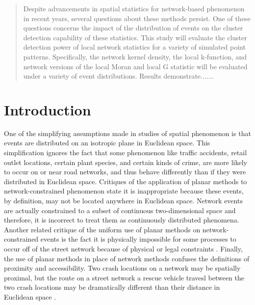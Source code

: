 \documentclass[12pt, letterpaper]{article}
\begin{document}
\maketitle{}
\newpage

\begin{abstract}

Despite advancements in spatial statistics for network-based phenomenon in recent years, several questions about these methods persist. One of these questions concerns the impact of the distribution of events on the cluster detection capability of these statistics. This study will evaluate the cluster detection power of local network statistics for a variety of simulated point patterns. Specifically, the network kernel density, the local k-function, and network versions of the local Moran and local G statistic will be evaluated under a variety of event distributions. Results demonstrate....... %

\end{abstract}
\newpage


\section{Introduction}

One of the simplifying assumptions made in studies of spatial phenomenon is that events are distributed on an isotropic plane in Euclidean space. This simplification ignores the fact that some phenomenon like traffic accidents, retail outlet locations, certain plant species, and certain kinds of crime, are more likely to occur on or near road networks, and thus behave differently than if they were distributed in Euclidean space. Critiques of the application of planar methods to network-constrained phenomenon state it is inappropriate because these events, by definition, may not be located anywhere in Euclidean space. Network events are actually constrained to a subset of continuous two-dimensional space \citep{yamada2004comparison, borruso2008network} and therefore, it is incorrect to treat them as continuously distributed phenomena. Another related critique of the uniform use of planar methods on network-constrained events is the fact it is physically impossible for some processes to occur off of the street network because of physical or legal constraints \citep{yamada2004comparison}. Finally, the use of planar methods in place of network methods confuses the definitions of proximity and accessibility. Two crash locations on a network may be spatially proximal, but the route on a street network a rescue vehicle travesl between the two crash locations may be dramatically different than their distance in Euclidean space \citep{yamada2004comparison}. 
\end{document}
